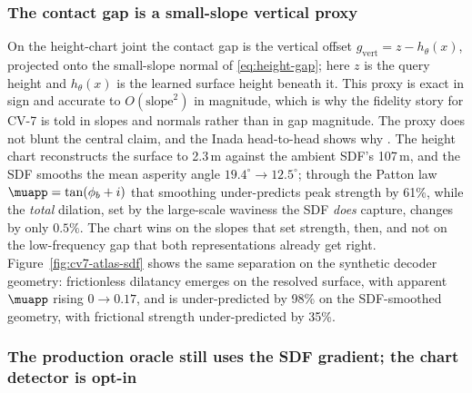 \subsubsection{The contact gap is a small-slope vertical proxy}

On the height-chart joint the contact gap is the vertical offset $g_{\mathrm{vert}}=z-h_\theta(x)$,
projected onto the small-slope normal of \eqref{eq:height-gap}; here $z$ is the query height and
$h_\theta(x)$ is the learned surface height beneath it. This proxy is exact in sign and accurate to
$O(\text{slope}^{2})$ in magnitude, which is why the fidelity story for CV-7 is told in slopes and
normals rather than in gap magnitude. The proxy does not blunt the central claim, and the Inada
head-to-head shows why \citep{inada2020digitalrocks}. The height chart reconstructs the surface to
2.3\,\textmu m against the ambient SDF's 107\,\textmu m, and the SDF smooths the mean asperity angle
$19.4^{\circ}\to 12.5^{\circ}$; through the Patton law $\muapp=\tan(\phi_b+i)$ \citep{patton1966multiple}
that smoothing under-predicts peak strength by 61\%, while the \emph{total} dilation, set by the
large-scale waviness the SDF \emph{does} capture, changes by only $0.5\%$. The chart wins on the
slopes that set strength, then, and not on the low-frequency gap that both representations already get
right. Figure~\ref{fig:cv7-atlas-sdf} shows the same separation on the synthetic decoder geometry:
frictionless dilatancy emerges on the resolved surface, with apparent $\muapp$ rising $0\to 0.17$, and is
under-predicted by 98\% on the SDF-smoothed geometry, with frictional strength under-predicted by 35\%.

\subsubsection{The production oracle still uses the SDF gradient; the chart detector is opt-in}

